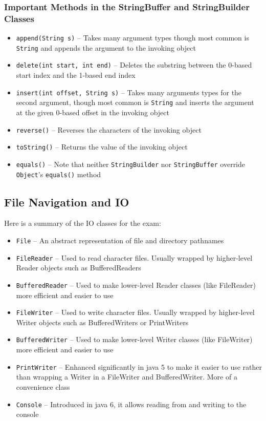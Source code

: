 \subsubsection{Important Methods in the StringBuffer and StringBuilder Classes}
\begin{itemize}
    \item \verb#append(String s)# -- Takes many argument types though most 
    common is \verb#String# and appends the argument to the invoking object
    \item \verb#delete(int start, int end)# -- Deletes the substring between 
    the 0-based start index and the 1-based end index
    \item \verb#insert(int offset, String s)# -- Takes many arguments types for 
    the second argument, though most common is \verb#String# and inserts the 
    argument at the given 0-based offset in the invoking object
    \item \verb#reverse()# -- Reverses the characters of the invoking object
    \item \verb#toString()# -- Returns the value of the invoking object
    \item \verb#equals()# -- Note that neither \verb#StringBuilder# nor
    \verb#StringBuffer# override \verb#Object#'s \verb#equals()# method
\end{itemize}

\subsection{File Navigation and IO}
Here is a summary of the IO classes for the exam:
\begin{itemize}
    \item \verb#File# -- An abstract representation of file and directory 
    pathnames
    \item \verb#FileReader# -- Used to read character files. Usually wrapped by 
    higher-level Reader objects such as BufferedReaders
    \item \verb#BufferedReader# -- Used to make lower-level Reader classes 
    (like FileReader) more efficient and easier to use
    \item \verb#FileWriter# -- Used to write character files. Usually wrapped 
    by higher-level Writer objects such as BufferedWriters or PrintWriters
    \item \verb#BufferedWriter# -- Used to make lower-level Writer classes 
    (like FileWriter) more efficient and easier to use
    \item \verb#PrintWriter# -- Enhanced significantly in java 5 to make it 
    easier to use rather than wrapping a Writer in a FileWriter and 
    BufferedWriter. More of a convenience class
    \item \verb#Console# -- Introduced in java 6, it allows reading from and 
    writing to the console
\end{itemize}

